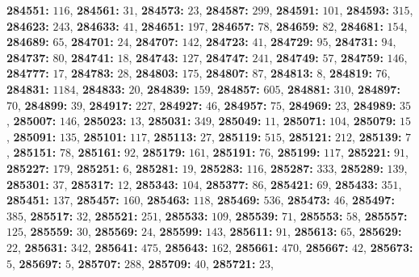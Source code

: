 \textsf{\bfseries 284551:} $116$, \textsf{\bfseries 284561:} $31$, \textsf{\bfseries 284573:} $23$, \textsf{\bfseries 284587:} $299$, \textsf{\bfseries 284591:} $101$, \textsf{\bfseries 284593:} $315$, \textsf{\bfseries 284623:} $243$, \textsf{\bfseries 284633:} $41$, \textsf{\bfseries 284651:} $197$, \textsf{\bfseries 284657:} $78$, \textsf{\bfseries 284659:} $82$, \textsf{\bfseries 284681:} $154$, \textsf{\bfseries 284689:} $65$, \textsf{\bfseries 284701:} $24$, \textsf{\bfseries 284707:} $142$, \textsf{\bfseries 284723:} $41$, \textsf{\bfseries 284729:} $95$, \textsf{\bfseries 284731:} $94$, \textsf{\bfseries 284737:} $80$, \textsf{\bfseries 284741:} $18$, \textsf{\bfseries 284743:} $127$, \textsf{\bfseries 284747:} $241$, \textsf{\bfseries 284749:} $57$, \textsf{\bfseries 284759:} $146$, \textsf{\bfseries 284777:} $17$, \textsf{\bfseries 284783:} $28$, \textsf{\bfseries 284803:} $175$, \textsf{\bfseries 284807:} $87$, \textsf{\bfseries 284813:} $8$, \textsf{\bfseries 284819:} $76$, \textsf{\bfseries 284831:} $1184$, \textsf{\bfseries 284833:} $20$, \textsf{\bfseries 284839:} $159$, \textsf{\bfseries 284857:} $605$, \textsf{\bfseries 284881:} $310$, \textsf{\bfseries 284897:} $70$, \textsf{\bfseries 284899:} $39$, \textsf{\bfseries 284917:} $227$, \textsf{\bfseries 284927:} $46$, \textsf{\bfseries 284957:} $75$, \textsf{\bfseries 284969:} $23$, \textsf{\bfseries 284989:} $35$, \textsf{\bfseries 285007:} $146$, \textsf{\bfseries 285023:} $13$, \textsf{\bfseries 285031:} $349$, \textsf{\bfseries 285049:} $11$, \textsf{\bfseries 285071:} $104$, \textsf{\bfseries 285079:} $15$, \textsf{\bfseries 285091:} $135$, \textsf{\bfseries 285101:} $117$, \textsf{\bfseries 285113:} $27$, \textsf{\bfseries 285119:} $515$, \textsf{\bfseries 285121:} $212$, \textsf{\bfseries 285139:} $7$, \textsf{\bfseries 285151:} $78$, \textsf{\bfseries 285161:} $92$, \textsf{\bfseries 285179:} $161$, \textsf{\bfseries 285191:} $76$, \textsf{\bfseries 285199:} $117$, \textsf{\bfseries 285221:} $91$, \textsf{\bfseries 285227:} $179$, \textsf{\bfseries 285251:} $6$, \textsf{\bfseries 285281:} $19$, \textsf{\bfseries 285283:} $116$, \textsf{\bfseries 285287:} $333$, \textsf{\bfseries 285289:} $139$, \textsf{\bfseries 285301:} $37$, \textsf{\bfseries 285317:} $12$, \textsf{\bfseries 285343:} $104$, \textsf{\bfseries 285377:} $86$, \textsf{\bfseries 285421:} $69$, \textsf{\bfseries 285433:} $351$, \textsf{\bfseries 285451:} $137$, \textsf{\bfseries 285457:} $160$, \textsf{\bfseries 285463:} $118$, \textsf{\bfseries 285469:} $536$, \textsf{\bfseries 285473:} $46$, \textsf{\bfseries 285497:} $385$, \textsf{\bfseries 285517:} $32$, \textsf{\bfseries 285521:} $251$, \textsf{\bfseries 285533:} $109$, \textsf{\bfseries 285539:} $71$, \textsf{\bfseries 285553:} $58$, \textsf{\bfseries 285557:} $125$, \textsf{\bfseries 285559:} $30$, \textsf{\bfseries 285569:} $24$, \textsf{\bfseries 285599:} $143$, \textsf{\bfseries 285611:} $91$, \textsf{\bfseries 285613:} $65$, \textsf{\bfseries 285629:} $22$, \textsf{\bfseries 285631:} $342$, \textsf{\bfseries 285641:} $475$, \textsf{\bfseries 285643:} $162$, \textsf{\bfseries 285661:} $470$, \textsf{\bfseries 285667:} $42$, \textsf{\bfseries 285673:} $5$, \textsf{\bfseries 285697:} $5$, \textsf{\bfseries 285707:} $288$, \textsf{\bfseries 285709:} $40$, \textsf{\bfseries 285721:} $23$, 
